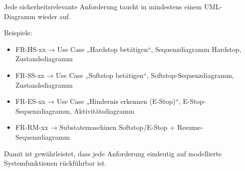 Jede sicherheitsrelevante Anforderung taucht in mindestens einem UML-Diagramm wieder auf.

Beispiele:

\begin{itemize}
    \item FR-HS-xx → Use Case „\ac{Hardstop} betätigen“, Sequenzdiagramm \ac{Hardstop}, Zustandsdiagramm
    \item FR-SS-xx → Use Case „\ac{Softstop} betätigen“, \ac{Softstop}-Sequenzdiagramm, Zustandsdiagramm
    \item FR-ES-xx → Use Case „Hindernis erkennen (\ac{E-Stop})“, \ac{E-Stop}-Sequenzdiagramm, Aktivitätsdiagramm
    \item FR-RM-xx → Substatemaschinen \ac{Softstop}/\ac{E-Stop} + Resume-Sequenzdiagramm
\end{itemize}

Damit ist gewährleistet, dass jede Anforderung eindeutig auf modellierte Systemfunktionen rückführbar ist.

